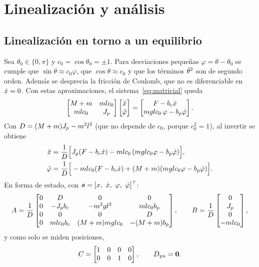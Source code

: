 \chapter{Linealización y análisis}
\label{cap:analisis}

\section{Linealización en torno a un equilibrio}

Sea $\theta_0\in\{0,\pi\}$ y $c_0=\cos\theta_0=\pm1$. Para desviaciones pequeñas $\varphi=\theta-\theta_0$ se cumple que $\sin\theta\approx c_0\varphi$, que $\cos\theta\approx c_0$ y que los términos $\dot{\theta}^2$ son de segundo orden. Además se desprecia la fricción de Coulomb, que no es diferenciable en $\dot{x}=0$. Con estas aproximaciones, el sistema~\eqref{eq:matricial} queda
\begin{equation}
\begin{bmatrix} M+m & mlc_0\\ mlc_0 & J_p\end{bmatrix}
\begin{bmatrix}\ddot{x}\\ \ddot\varphi\end{bmatrix}
=
\begin{bmatrix} F - b_c\dot{x}\\ mglc_0\,\varphi - b_p\dot\varphi\end{bmatrix} .
\end{equation}
Con $D=(M+m)J_p-m^2l^2$ (que no depende de $c_0$, porque $c_0^2=1$), al invertir se obtiene
\begin{align}
\ddot{x} &= \frac{1}{D}\Big[J_p(F-b_c\dot{x}) - mlc_0\,(mglc_0\varphi - b_p\dot\varphi)\Big],\\
\ddot\varphi &= \frac{1}{D}\Big[-mlc_0(F-b_c\dot{x}) + (M+m)(mglc_0\varphi - b_p\dot\varphi)\Big].
\end{align}
En forma de estado, con $\vect{s}=[x,\ \xd,\ \varphi,\ \dot\varphi]^\top$:
\begin{equation}
A=\frac1D\begin{bmatrix}
0 & D & 0 & 0\\
0 & -J_p b_c & -m^2gl^2 & mlc_0b_p\\
0 & 0 & 0 & D\\
0 & mlc_0b_c & (M+m)mglc_0 & -(M+m)b_p
\end{bmatrix},\qquad
B=\frac1D\begin{bmatrix}0\\ J_p\\ 0\\ -mlc_0\end{bmatrix},
\label{eq:AB}
\end{equation}
y como solo se miden posiciones,
\begin{equation}
C=\begin{bmatrix}1&0&0&0\\0&0&1&0\end{bmatrix},\qquad D_{yu}=\bm{0}.
\end{equation}

